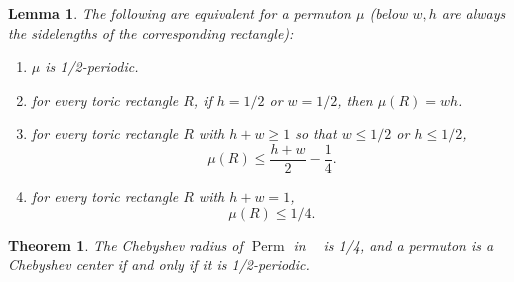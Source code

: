 \documentclass[10pt,a4paper]{amsart}
\newtheorem{theorem}{Theorem}
\newtheorem{lemma}{Lemma}
\newcommand{\Perm}{\mathop{\mathrm{Perm}}}
\newcommand{\ds}{\mathop{d_\square}}
\begin{document}
\begin{lemma}\label{lemma:1/2_periodicity_equivalence}
    The following are equivalent for a permuton $\mu$ (below $w, h$ are always the sidelengths of the corresponding rectangle):
    \begin{enumerate}
        \item[(i)] $\mu$ is 1/2-periodic.
        \item[(ii)] for every toric rectangle $R$, if $h=1/2$ or $w=1/2$, then $\mu(R)=wh$.
        \item[(iii)] for every toric rectangle $R$ with $h+w\geq 1$ so that $w\leq 1/2$ or $h\leq 1/2$,
        $$\mu(R)\leq \frac{h+w}{2}-\frac{1}{4}.$$
        \item[(iv)] for every toric rectangle $R$ with $h+w=1$,
        $$\mu(R)\leq 1/4.$$
    \end{enumerate}
\end{lemma}

\begin{theorem} \label{thm:main}
    The Chebyshev radius of $\Perm$ in $\ds$ is 1/4, and a permuton is a Chebyshev center if and only if it is 1/2-periodic.
\end{theorem}
\end{document}
